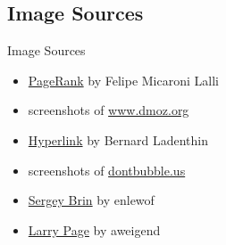 \subsection{Image Sources}
\begin{frame}{Image Sources}
    \begin{itemize}
	\item \href{https://commons.wikimedia.org/wiki/File:PageRank-hi-res.png}{PageRank} by Felipe Micaroni Lalli
	\item screenshots of \href{http://www.dmoz.org}{www.dmoz.org}
	\item \href{https://commons.wikimedia.org/wiki/File:Hyperlink-Wikipedia.svg}{Hyperlink} by Bernard Ladenthin
	\item screenshots of \href{http://dontbubble.us}{dontbubble.us}
        \item \href{http://commons.wikimedia.org/wiki/File:Sergey_Brin.JPG}{Sergey Brin} by enlewof
        \item \href{http://commons.wikimedia.org/wiki/File:Larry_Page_laughs.jpg}{Larry Page} by aweigend
    \end{itemize}
\end{frame}
